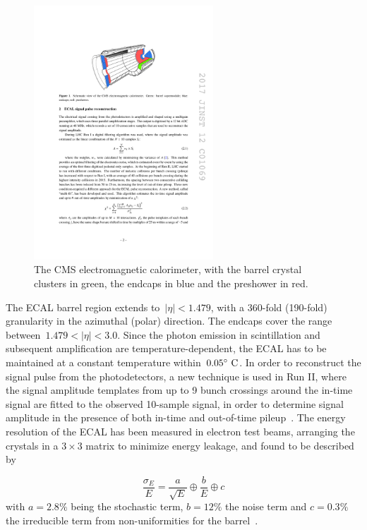 \begin{figure}
\begin{centering}
\includegraphics[width=0.6\textwidth]{figures/exp/ecal.pdf}
\caption[The structure of the CMS electromagnetic calorimeter]{The CMS electromagnetic calorimeter, with the barrel crystal clusters in green, the endcaps in blue and the preshower in red.}
\label{fig:cms_ecal}
\end{centering}
\end{figure}

The ECAL barrel region extends to~$|\eta| < 1.479$, with a 360-fold (190-fold) granularity in the azimuthal (polar) direction. The endcaps cover the range between~$1.479 < |\eta| < 3.0$. Since the photon emission in scintillation and subsequent amplification are temperature-dependent, the ECAL has to be maintained at a constant temperature within~$0.05\degree~\mathrm{C}$. In order to reconstruct the signal pulse from the photodetectors, a new technique is used in Run II, where the signal amplitude templates from up to 9 bunch crossings around the in-time signal are fitted to the observed 10-sample signal, in order to determine signal amplitude in the presence of both in-time and out-of-time pileup~\cite{Brianza:2017slq}. The energy resolution of the ECAL has been measured in electron test beams, arranging the crystals in a $3\times3$ matrix to minimize energy leakage, and found to be described by

\begin{equation}
\frac{\sigma_E}{E} = \frac{a}{\sqrt{E}} \oplus \frac{b}{E} \oplus c
\end{equation}
with $a = 2.8\%$ being the stochastic term, $b = 12\%$ the noise term and $c = 0.3\%$ the irreducible term from non-uniformities for the barrel~\cite{Adzic:2007mi}.

